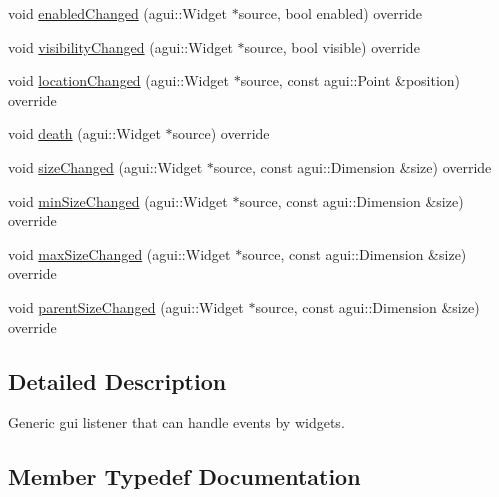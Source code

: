 \begin{DoxyCompactItemize}
void \mbox{\hyperlink{classec_1_1_generic_widget_listener_a0d25da5c3238a159301ccedfc356835c}{enabled\+Changed}} (agui\+::\+Widget $\ast$source, bool enabled) override
\item 
void \mbox{\hyperlink{classec_1_1_generic_widget_listener_a6f9e7db28e619ab8c538152972fe6c97}{visibility\+Changed}} (agui\+::\+Widget $\ast$source, bool visible) override
\item 
void \mbox{\hyperlink{classec_1_1_generic_widget_listener_a030090089623f7cae136d619e67a075d}{location\+Changed}} (agui\+::\+Widget $\ast$source, const agui\+::\+Point \&position) override
\item 
void \mbox{\hyperlink{classec_1_1_generic_widget_listener_a528f121d3af10fea1e966a5d8baa86f5}{death}} (agui\+::\+Widget $\ast$source) override
\item 
void \mbox{\hyperlink{classec_1_1_generic_widget_listener_a8566ffeb05ef271dc60c7b5215efca21}{size\+Changed}} (agui\+::\+Widget $\ast$source, const agui\+::\+Dimension \&size) override
\item 
void \mbox{\hyperlink{classec_1_1_generic_widget_listener_af3cb291bf020116053ee7955d40bc786}{min\+Size\+Changed}} (agui\+::\+Widget $\ast$source, const agui\+::\+Dimension \&size) override
\item 
void \mbox{\hyperlink{classec_1_1_generic_widget_listener_ae1341f57e8a72d4222d855031301f346}{max\+Size\+Changed}} (agui\+::\+Widget $\ast$source, const agui\+::\+Dimension \&size) override
\item 
void \mbox{\hyperlink{classec_1_1_generic_widget_listener_ac028b637c04e199f30769df5bc30a0b2}{parent\+Size\+Changed}} (agui\+::\+Widget $\ast$source, const agui\+::\+Dimension \&size) override
\end{DoxyCompactItemize}


\subsection{Detailed Description}
Generic gui listener that can handle events by widgets. 

\subsection{Member Typedef Documentation}
\mbox{\label{classec_1_1_generic_widget_listener_ae374d6d8d2ca9eac9e362a2e587b6ae5}} 
